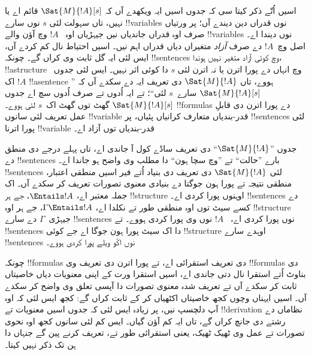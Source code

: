 \documentclass[../../../include/open-logic-section]{subfiles}
\begin{document}


اسیں اُتّے ذکر کیتا سی کہ جدوں اسیں ایہ ویکھدے آں کہ
$\Sat{M}{!A}[s]$ قائم اے یا نہیں، تاں سہولت لئی
$s$ نوں سارے !!{variable}s نوں قدراں دین دیندے آں؛
پر ورتیاں صرف اوہ قدراں جاندیاں نیں جیہڑیاں اوہ
~$!A$ وچ آؤن والے !!{variable}s نوں دیندا اے۔
اصل وچ~$!A$ دے صرف \emph{آزاد} متغیراں دیاں
قدراں اہم نیں۔ اسیں احتیاط نال کم کردے آں،
ایس لئی ایہ گل ثابت وی کراں گے۔ چونکہ
!!{sentence}s وچ کوئی آزاد متغیر نہیں ہوندا،
!!a{structure} وچ انہاں دے پورا اترن یا نہ
اترن لئی $s$ دا کوئی اثر نہیں۔ ایس لئی
جدوں~$!A$ اک !!a{sentence} ہووے، تاں
$\Sat{M}{!A}$ دی تعریف ایہ دے سکدے آں کہ
”$\Sat{M}{!A}[s]$ سارے~$s$ لئی“؛
تے ایہ اُدوں تے صرف اُدوں سچ اے جدوں
$\Sat{M}{!A}[s]$ گھٹ توں گھٹ اک~$s$ لئی ہووے۔
!!{formula}s دے پورا اترن دی قابلِ عمل تعریف
لئی سانوں !!{variable} قدر-بندیاں متعارف
کرانیاں پئیاں، پر !!{sentence}s لئی پورا
اترنا !!{variable} قدر-بندیاں توں آزاد اے۔

جدوں ”$\Sat{M}{!A}$“ دی تعریف ساڈے کول آ
جاندی اے، تاں پہلے درجے دی منطق دے
!!{sentence}s بارے ”حالت“ تے ”وچ سچا ہون“
دا مطلب وی واضح ہو جاندا اے۔ !!{sentence}s
لئی $\Sat{M}{!A}$ دی تعریف دی بنیاد اُتے
فیر اسیں منطقی اعتبار، منطقی نتیجہ تے پورا
ہون جوگتا دے بنیادی معنوی تصورات تعریف
کر سکدے آں۔ اک جملہ معتبر اے،
$\Entails !A$، جے ہر !!{structure}
اوہنوں پورا کردی اے۔ !!{sentence}s دے کسے سیٹ
توں اوہ منطقی طور تے نکلدا اے،
$\Gamma \Entails !A$، جے ہر اوہ
!!{structure} جیہڑی~$\Gamma$ دے سارے
!!{sentence}s نوں پورا کردی اے،
~$!A$ نوں وی پورا کردی ہووے۔ تے
!!{sentence}s دا اک سیٹ پورا ہون جوگا
اے جے کوئی !!{structure} اوہدے سارے
!!{sentence}s نوں اکّو ویلے پورا کردی ہووے۔

چونکہ !!{formula}s دی تعریف استقرائی اے،
تے پورا اترن دی تعریف وی !!{formula}s دی
بناوٹ اُتے استقرا نال دتی جاندی اے،
اسیں استقرا ورت کے اپنی معنویات دیاں
خاصیتاں ثابت کر سکدے آں تے تعریف شدہ
معنوی تصورات دا آپسی تعلق وی واضح
کر سکدے آں۔ اسیں ایہناں وچوں کجھ
خاصیتاں اکٹھیاں کر کے ثابت کراں گے:
کجھ ایس لئی کہ اوہ آپ دلچسپ نیں،
پر زیادہ ایس لئی کہ جدوں اسیں معنویات
تے !!{derivation} نظاماں دے رشتے دی
جانچ کراں گے، تاں ایہ کم آؤن گیاں۔
ایس کم لئی سانوں کجھ اوہ نحوی تصورات
تے عمل وی ٹھیک ٹھیک، یعنی استقرائی
طور تے، تعریف کرنے پین گے جنہاں دا
ہن تک ذکر نہیں کیتا۔
\end{document}
